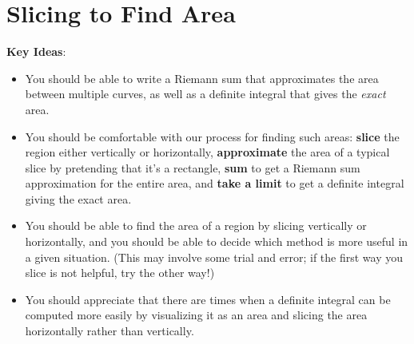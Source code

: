 \documentclass[main]{subfiles}
\begin{document}
\ifSubfilesClassLoaded{%
  \chaptermark{\chaptersix}
}{}

\section{Slicing to Find Area} \label{ws6-5}

\begin{problemonly}
    \begin{framed}

\textbf{Key Ideas}:

\begin{itemize}[topsep=0pt,partopsep=0pt,parsep=8pt,itemsep=0pt]


\item You should be able to write a Riemann sum that approximates the area
  between multiple curves, as well as a definite integral that gives the
  \emph{exact} area.

\item You should be comfortable with our process for finding such areas:
  \textbf{slice} the region either vertically or horizontally,
  \textbf{approximate} the area of a typical slice by pretending that it's
  a rectangle, \textbf{sum} to get a Riemann sum approximation for the
  entire area, and \textbf{take a limit} to get a definite integral giving
  the exact area. 

\item You should be able to find the area of a region by slicing
  vertically or horizontally, and you should be able to decide which
  method is more useful in a given situation.  (This may involve some
  trial and error; if the first way you slice is not helpful, try the
  other way!)

\item You should appreciate that there are times when a definite integral
  can be computed more easily by visualizing it as an area and slicing the
  area horizontally rather than vertically.


\end{itemize}
\end{framed}
\end{problemonly}
\end{document}
